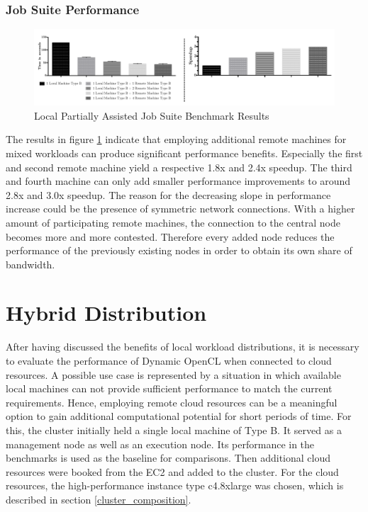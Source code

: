 \subsubsection*{Job Suite Performance}
\label{job_suite_performance}

\begin{figure}[!htb]

	\includegraphics[width=1.0\textwidth]{images/local_partially_assisted_full_benchmark.pdf}
	\centering
	\caption{Local Partially Assisted Job Suite Benchmark Results}
	\label{img:local_benchmark_results}
\end{figure}

The results in figure \ref{img:local_benchmark_results} indicate that employing additional remote machines for mixed workloads can produce significant performance benefits. Especially the first and second remote machine yield a respective 1.8x and 2.4x speedup. The third and fourth machine can only add smaller performance improvements to around 2.8x and 3.0x speedup. The reason for the decreasing slope in performance increase could be the presence of symmetric network connections. With a higher amount of participating remote machines, the connection to the central node becomes more and more contested. Therefore every added node reduces the performance of the previously existing nodes in order to obtain its own share of bandwidth.


\section{Hybrid Distribution}

After having discussed the benefits of local workload distributions, it is necessary to evaluate the performance of Dynamic OpenCL when connected to cloud resources. A possible use case is represented by a situation in which available local machines can not provide sufficient performance to match the current requirements. Hence, employing remote cloud resources can be a meaningful option to gain additional computational potential for short periods of time. For this, the cluster initially held a single local machine of Type B. It served as a management node as well as an execution node. Its performance in the benchmarks is used as the baseline for comparisons. Then additional cloud resources were booked from the EC2 and added to the cluster. For the cloud resources, the high-performance instance type c4.8xlarge was chosen, which is described in section \ref{cluster_composition}.

